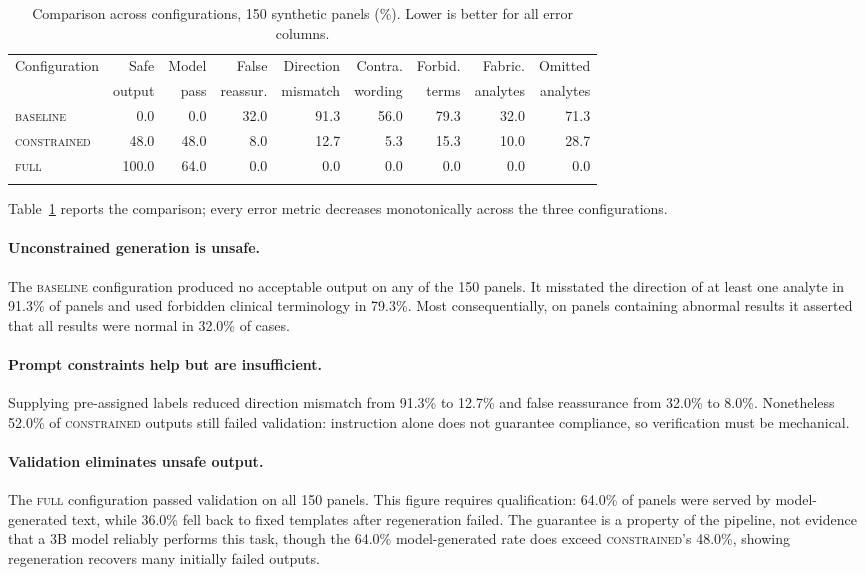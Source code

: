 \documentclass{svproc}
\begin{document}
\begin{table}[htbp]
\caption{Comparison across configurations, 150 synthetic panels (\%).
Lower is better for all error columns.}
\label{tab:results}
\centering
\setlength{\tabcolsep}{3pt}
\fontsize{8}{9.6}\selectfont
\begin{tabular}{lrrrrrrrr}
\hline\noalign{\smallskip}
Configuration & Safe & Model & False & Direction & Contra. & Forbid. &
Fabric. & Omitted \\
 & output & pass & reassur. & mismatch & wording & terms & analytes
& analytes \\
\noalign{\smallskip}\hline\noalign{\smallskip}
\textsc{baseline}    & 0.0 & 0.0 & 32.0 & 91.3 & 56.0 & 79.3 & 32.0 & 71.3 \\
\textsc{constrained} & 48.0 & 48.0 & 8.0 & 12.7 & 5.3 & 15.3 & 10.0 & 28.7 \\
\textsc{full}        & 100.0 & 64.0 & 0.0 & 0.0 & 0.0 & 0.0 & 0.0 & 0.0 \\
\noalign{\smallskip}\hline
\end{tabular}
\end{table}

Table~\ref{tab:results} reports the comparison; every error metric
decreases monotonically across the three configurations.

\paragraph{Unconstrained generation is unsafe.}
The \textsc{baseline} configuration produced no acceptable output on any
of the 150 panels. It misstated the direction of at least one analyte in
91.3\% of panels and used forbidden clinical terminology in 79.3\%. Most
consequentially, on panels containing abnormal results it asserted that
all results were normal in 32.0\% of cases.

\paragraph{Prompt constraints help but are insufficient.}
Supplying pre-assigned labels reduced direction mismatch from 91.3\% to
12.7\% and false reassurance from 32.0\% to 8.0\%. Nonetheless 52.0\% of
\textsc{constrained} outputs still failed validation: instruction alone
does not guarantee compliance, so verification must be mechanical.

\paragraph{Validation eliminates unsafe output.}
The \textsc{full} configuration passed validation on all 150 panels. This
figure requires qualification: 64.0\% of panels were served by
model-generated text, while 36.0\% fell back to fixed templates after
regeneration failed. The guarantee is a property of the pipeline, not
evidence that a 3B model reliably performs this task, though the
64.0\% model-generated rate does exceed \textsc{constrained}'s 48.0\%,
showing regeneration recovers many initially failed outputs.
\end{document}
